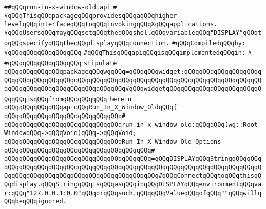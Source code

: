 \label{src/lib/x-kit/widget/old/lib/run-in-x-window-old.api}
\verb|##qQQqrun-in-x-window-old.api|\newline
\verb|#|\newline
\verb|#qQQqThisqQQqpackageqQQqprovidesqQQqaqQQqhigher-levelqQQqinterfaceqQQqtoqQQqinvokingqQQqXqQQqapplications.|\newline
\verb|#qQQqUsersqQQqmayqQQqsetqQQqtheqQQqshellqQQqvariableqQQq"DISPLAY"qQQqtoqQQqspecifyqQQqtheqQQqdisplayqQQqconnection.|\newline
\newline
\verb|#qQQqCompiledqQQqby:|\newline
\verb|#qQQqqQQqqQQqqQQqqQQq|\newline
\newline
\newline
\verb|#qQQqThisqQQqapiqQQqisqQQqimplementedqQQqin:|\newline
\verb|#|\newline
\verb|#qQQqqQQqqQQqqQQqqQQq|\newline
\newline
\verb|stipulate|\newline
\verb|qQQqqQQqqQQqqQQqpackageqQQqwgqQQq=qQQqqQQqwidget;qQQqqQQqqQQqqQQqqQQqqQQqqQQqqQQqqQQqqQQqqQQqqQQqqQQqqQQqqQQqqQQqqQQqqQQqqQQqqQQqqQQqqQQqqQQqqQQqqQQqqQQqqQQqqQQqqQQqqQQqqQQq#qQQqwidgetqQQqqQQqqQQqqQQqqQQqqQQqqQQqqQQqisqQQqfromqQQqqQQqqQQq|\newline
\verb|herein|\newline
\newline
\verb|qQQqqQQqqQQqqQQqapiqQQqRun_In_X_Window_OldqQQq{|\newline
\verb|qQQqqQQqqQQqqQQqqQQqqQQqqQQqqQQq#|\newline
\verb|qQQqqQQqqQQqqQQqqQQqqQQqqQQqqQQqrun_in_x_window_old:qQQqqQQq(wg::Root_WindowqQQq->qQQqVoid)qQQq->qQQqVoid;|\newline
\newline
\verb|qQQqqQQqqQQqqQQqqQQqqQQqqQQqqQQqRun_In_X_Window_Old_Options|\newline
\verb|qQQqqQQqqQQqqQQqqQQqqQQqqQQqqQQqqQQqqQQq#|\newline
\verb|qQQqqQQqqQQqqQQqqQQqqQQqqQQqqQQqqQQqqQQq=qQQqDISPLAYqQQqStringqQQqqQQqqQQqqQQqqQQqqQQqqQQqqQQqqQQqqQQqqQQqqQQqqQQqqQQqqQQqqQQqqQQqqQQqqQQqqQQqqQQqqQQqqQQqqQQqqQQqqQQqqQQqqQQqqQQqqQQq#qQQqConnectqQQqtoqQQqthisqQQqdisplay.qQQqStringqQQqisqQQqasqQQqinqQQqDISPLAYqQQqenvironmentqQQqvar:qQQq"127.0.0.1:0.0"qQQqorqQQqsuch.qQQqqQQqValueqQQqofqQQq""qQQqwillqQQqbeqQQqignored.|\newline
